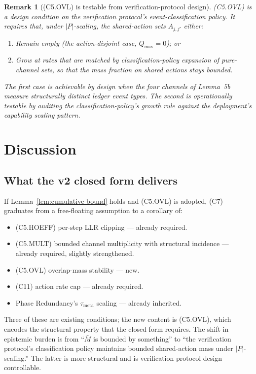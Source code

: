 \documentclass{article}
\newtheorem{remark}{Remark}
\newcommand{\taumeta}{\tau_{\mathrm{meta}}}
\begin{document}
\begin{remark}[(C5.OVL) is testable from verification-protocol design]
\label{rem:c5-ovl-design}
(C5.OVL) is a \emph{design condition} on the verification
protocol's event-classification policy.  It requires that, under
$|P|$-scaling, the shared-action sets $A_{j, j'}$ either:
\begin{enumerate}
\item Remain empty (the action-disjoint case, $Q_{\max} = 0$); or
\item Grow at rates that are matched by classification-policy
  expansion of pure-channel sets, so that the \emph{mass fraction}
  on shared actions stays bounded.
\end{enumerate}
The first case is achievable by design when the four channels of
Lemma~5b measure structurally distinct ledger event types.  The
second is operationally testable by auditing the
classification-policy's growth rule against the deployment's
capability scaling pattern.
\end{remark}

\section{Discussion}

\subsection{What the v2 closed form delivers}

If Lemma~\ref{lem:cumulative-bound} holds and (C5.OVL) is
adopted, (C7) graduates from a free-floating assumption to a
corollary of:
\begin{itemize}
\item (C5.HOEFF) per-step LLR clipping --- already required.
\item (C5.MULT) bounded channel multiplicity with structural
  incidence --- already required, slightly strengthened.
\item (C5.OVL) overlap-mass stability --- new.
\item (C11) action rate cap --- already required.
\item Phase Redundancy's $\taumeta$ scaling --- already inherited.
\end{itemize}

Three of these are existing conditions; the new content is
(C5.OVL), which encodes the structural property that the closed
form requires.  The shift in epistemic burden is from ``$\bar{M}$
is bounded by something'' to ``the verification protocol's
classification policy maintains bounded shared-action mass under
$|P|$-scaling.''  The latter is more structural and is
verification-protocol-design-controllable.
\end{document}
